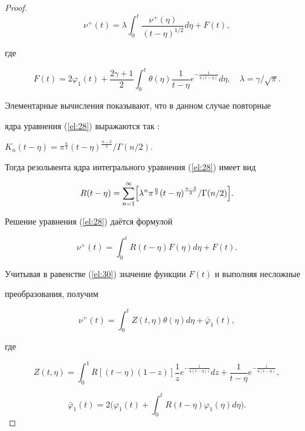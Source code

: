 \begin{proof}
\begin{equation}
\nu^+(t)=\lambda\int_0^t\frac{\nu^+(\eta)}{(t-\eta)^{1/2}}d\eta+F(t),

\end{equation}

где

$$F(t)=2\varphi_1(t)+\frac{2\gamma+1}{2}\int_0^t\theta(\eta)\frac{1}{t-\eta}e^{-\frac{1}{4(t-\eta)}}d\eta,

\quad \lambda=\gamma/\sqrt{\pi}.$$



Элементарные вычисления показывают, что в данном случае повторные

ядра уравнения (\ref{el:28}) выражаются так \cite{eleevbalk:bib:Str}:

$K_n(t-\eta)=\pi^{\frac{n}{2}}(t-\eta)^{\frac{n-2}{2}}/\Gamma(n/2)$.



Тогда резольвента ядра интегрального уравнения (\ref{el:28}) имеет вид



\begin{equation} \label{el:29}

R(t-\eta)=\sum\limits_{n=1}^\infty\Bigl[\lambda^n\pi^{\frac{n}{2}}(t-\eta)^{\frac{n-2}{2}}/\Gamma(n/2)\Bigr].

\end{equation}



Решение уравнения (\ref{el:28}) даётся формулой

\begin{equation} \label{el:30}

\nu^+(t)=\int_0^tR(t-\eta)F(\eta)d\eta+F(t).

\end{equation}



Учитывая в равенстве (\ref{el:30}) значение функции $F(t)$ и выполняя несложные

преобразования, получим

\begin{equation} \label{el:31}

\nu^+(t)=\int_0^tZ(t,\eta)\theta(\eta)d\eta+\bar{\varphi}_1(t),

\end{equation}

где

$$Z(t,\eta)=\int_0^1R[(t-\eta)(1-z)]\frac{1}{z}e^{-\frac{1}{4(t-\eta)z}}dz+\frac{1}{t-\eta}e^{-\frac{1}{4(t-\eta)}},$$

$$\bar{\varphi}_1(t)=2\biggl(\varphi_1(t)+\int_0^tR(t-\eta)\varphi_1(\eta)d\eta\biggr).$$




\end{proof}
